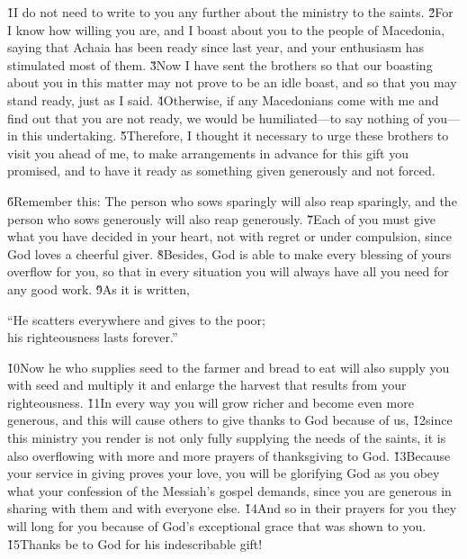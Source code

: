 \v{1}I do not need to write to you any further about the ministry to the saints. \v{2}For I know how willing you are, and I boast about you to the people of Macedonia, saying that Achaia has been ready since last year, and your enthusiasm has stimulated most of them. \v{3}Now I have sent the brothers so that our boasting about you in this matter may not prove to be an idle boast, and so that you may stand ready, just as I said. \v{4}Otherwise, if any Macedonians come with me and find out that you are not ready, we would be humiliated---to say nothing of you---in this undertaking. \v{5}Therefore, I thought it necessary to urge these brothers to visit you ahead of me, to make arrangements in advance for this gift you promised, and to have it ready as something given generously and not forced.

\v{6}Remember this: The person who sows sparingly will also reap sparingly, and the person who sows generously will also reap generously. \v{7}Each of you must give what you have decided in your heart, not with regret or under compulsion, since God loves a cheerful giver. \v{8}Besides, God is able to make every blessing of yours overflow for you, so that in every situation you will always have all you need for any good work. \v{9}As it is written,

\begin{poetry}
\poeml ``He scatters everywhere and gives to the poor; \\
\poemll    his righteousness lasts forever.''
\end{poetry}

\v{10}Now he who supplies seed to the farmer and bread to eat will also supply you with seed and multiply it and enlarge the harvest that results from your righteousness. \v{11}In every way you will grow richer and become even more generous, and this will cause others to give thanks to God because of us, \v{12}since this ministry you render is not only fully supplying the needs of the saints, it is also overflowing with more and more prayers of thanksgiving to God. \v{13}Because your service in giving proves your love, you will be glorifying God as you obey what your confession of the Messiah's gospel demands, since you are generous in sharing with them and with everyone else. \v{14}And so in their prayers for you they will long for you because of God's exceptional grace that was shown to you. \v{15}Thanks be to God for his indescribable gift!

